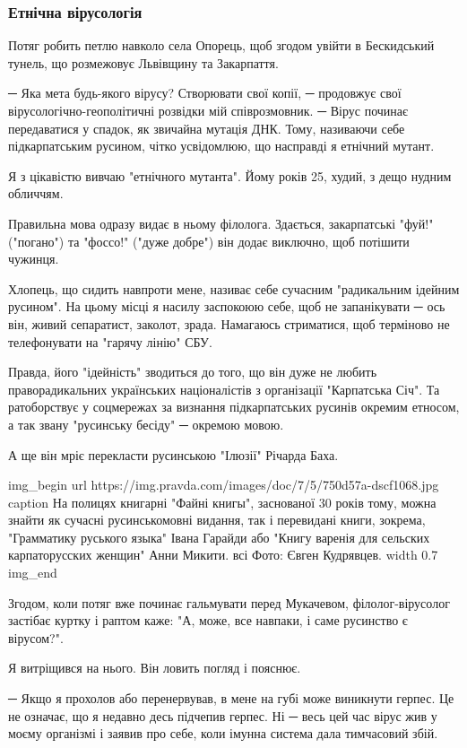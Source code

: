 \subsubsection{Етнічна вірусологія}

Потяг робить петлю навколо села Опорець, щоб згодом увійти в Бескидський
тунель, що розмежовує Львівщину та Закарпаття.

─ Яка мета будь-якого вірусу? Створювати свої копії, ─ продовжує свої
вірусологічно-геополітичні розвідки мій співрозмовник. ─ Вірус починає
передаватися у спадок, як звичайна мутація ДНК. Тому, називаючи себе
підкарпатським русином, чітко усвідомлюю, що насправді я етнічний мутант.

Я з цікавістю вивчаю "етнічного мутанта". Йому років 25, худий, з дещо нудним
обличчям.

Правильна мова одразу видає в ньому філолога. Здається, закарпатські "фуй!"
("погано") та "фоссо!" ("дуже добре") він додає виключно, щоб потішити чужинця.

Хлопець, що сидить навпроти мене, називає себе сучасним "радикальним ідейним
русином". На цьому місці я насилу заспокоюю себе, щоб не запанікувати ─ ось
він, живий сепаратист, заколот, зрада. Намагаюсь стриматися, щоб терміново не
телефонувати на "гарячу лінію" СБУ. 

Правда, його "ідейність" зводиться до того, що він дуже не любить
праворадикальних українських націоналістів з організації "Карпатська Січ". Та
ратоборствує у соцмережах за визнання підкарпатських русинів окремим етносом, а
так звану "русинську бесіду" ─ окремою мовою.

А ще він мріє перекласти русинською "Ілюзії" Річарда Баха.

\ifcmt
img_begin 
    url https://img.pravda.com/images/doc/7/5/750d57a-dscf1068.jpg
    caption На полицях книгарні "Файні книгы", заснованої 30 років тому, можна знайти як сучасні русинськомовні видання, так і перевидані книги, зокрема, "Грамматику руського языка" Івана Гарайди або "Книгу варенія для сельских карпаторусских женщин" Анни Микити. всі Фото: Євген Кудрявцев.
    width 0.7
img_end
\fi

Згодом, коли потяг вже починає гальмувати перед Мукачевом, філолог-вірусолог
застібає куртку і раптом каже: "А, може, все навпаки, і саме русинство є
вірусом?".

Я витріщився на нього. Він ловить погляд і пояснює.

─ Якщо я прохолов або перенервував, в мене на губі може виникнути герпес. Це не
означає, що я недавно десь підчепив герпес. Ні ─ весь цей час вірус жив у моєму
організмі і заявив про себе, коли імунна система дала тимчасовий збій.

